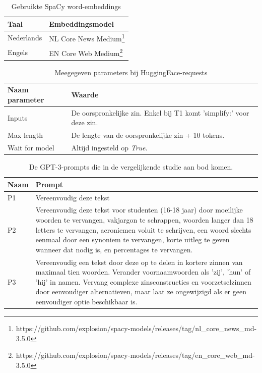 \begin{center}
	\begin{table}[H]
		\begin{tabular}{ | m{7cm} | m{7cm} | } 
			\hline
			\textbf{Taal} & \textbf{Embeddingsmodel} \\
			\hline
			Nederlands & NL Core News Medium\footnote{https://github.com/explosion/spacy-models/releases/tag/nl_core_news_md-3.5.0} \\ 
			\hline
			Engels & EN Core Web Medium\footnote{https://github.com/explosion/spacy-models/releases/tag/en_core_web_md-3.5.0} \\
			\hline
		\end{tabular}
		\caption{Gebruikte SpaCy word-embeddings}
		\label{table:wordembeddings-spacy}
	\end{table}
\end{center}

\begin{center}
	\begin{table}[H]
		\begin{tabular}{ | m{6cm} | m{8cm} | } 
			\hline
			\textbf{Naam parameter} & \textbf{Waarde} \\
			\hline
			Inputs & De oorspronkelijke zin. Enkel bij T1 komt 'simplify:' voor deze zin. \\
			\hline
			Max length & De lengte van de oorspronkelijke zin + 10 tokens. \\
			\hline
			Wait for model & Altijd ingesteld op \textit{True}. \\
			\hline
		\end{tabular}
		\caption{Meegegeven parameters bij HuggingFace-requests}
		\label{table:huggingface-requests-parameters}
	\end{table}
\end{center}

\begin{center}
	\begin{table}[H]
		\begin{tabular}{ | m{2cm} | m{13cm} | } 
			\hline
			\textbf{Naam} & \textbf{Prompt} \\
			\hline
			P1 & Vereenvoudig deze tekst \\
			\hline
			P2 & Vereenvoudig deze tekst voor studenten (16-18 jaar) door moeilijke woorden te vervangen, vakjargon te schrappen, woorden langer dan 18 letters te vervangen, acroniemen voluit te schrijven, een woord slechts eenmaal door een synoniem te vervangen, korte uitleg te geven wanneer dat nodig is, en percentages te vervangen. \\
			\hline
			P3 & Vereenvoudig een tekst door deze op te delen in kortere zinnen van maximaal tien woorden. Verander voornaamwoorden als 'zij', 'hun' of 'hij' in namen. Vervang complexe zinsconstructies en voorzetselzinnen door eenvoudiger alternatieven, maar laat ze ongewijzigd als er geen eenvoudiger optie beschikbaar is. \\
			\hline
		\end{tabular}
		\caption{De GPT-3-prompts die in de vergelijkende studie aan bod komen.}
		\label{table:tested-prompts}
	\end{table}
\end{center}


